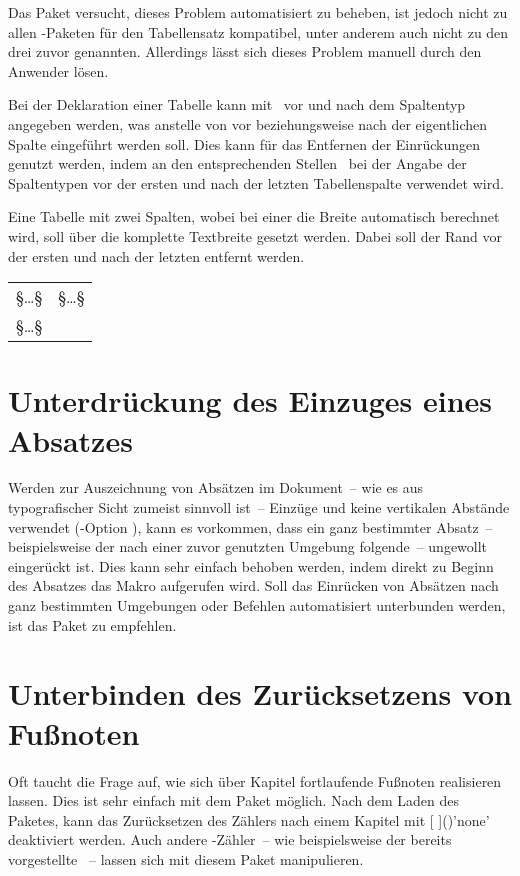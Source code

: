 Das Paket  versucht, dieses Problem automatisiert zu 
beheben, ist jedoch nicht zu allen -Paketen für den Tabellensatz 
kompatibel, unter anderem auch nicht zu den drei zuvor genannten. Allerdings 
lässt sich dieses Problem manuell durch den Anwender lösen. 

Bei der Deklaration einer Tabelle kann mit~\PParameter{\dots} vor und 
nach dem Spaltentyp angegeben werden, was anstelle von  vor 
beziehungsweise nach der eigentlichen Spalte eingeführt werden soll. Dies kann 
für das Entfernen der Einrückungen genutzt werden, indem an den entsprechenden 
Stellen~ bei der Angabe der Spaltentypen vor der ersten 
und nach der letzten Tabellenspalte verwendet wird.
%
\begin{Example}
Eine Tabelle mit zwei Spalten, wobei bei einer die Breite automatisch berechnet 
wird, soll über die komplette Textbreite gesetzt werden. Dabei soll der Rand 
vor der ersten und nach der letzten entfernt werden.
\begin{Code}[escapechar=§]
\begin{tabularx}{\textwidth}{@{}lX@{}}
§\dots§ & §\dots§ \tabularnewline
§\dots§
\end{tabularx}
\end{Code}
\end{Example}




\section{Unterdrückung des Einzuges eines Absatzes}
%
%
Werden zur Auszeichnung von Absätzen im Dokument~-- wie es aus typografischer 
Sicht zumeist sinnvoll ist~-- Einzüge und keine vertikalen Abstände verwendet
(\KOMAScript-Option ), kann es vorkommen, dass ein ganz 
bestimmter Absatz~-- beispielsweise der nach einer zuvor genutzten Umgebung 
folgende~-- ungewollt eingerückt ist. Dies kann sehr einfach behoben werden, 
indem direkt zu Beginn des Absatzes das Makro  aufgerufen wird. 
Soll das Einrücken von Absätzen nach ganz bestimmten Umgebungen oder Befehlen 
automatisiert unterbunden werden, ist das Paket  zu 
empfehlen.



\section{Unterbinden des Zurücksetzens von Fußnoten}%
%
%
%
Oft taucht die Frage auf, wie sich über Kapitel fortlaufende Fußnoten 
realisieren lassen. Dies ist sehr einfach mit dem Paket  
möglich. Nach dem Laden des Paketes, kann das Zurücksetzen des Zählers nach 
einem Kapitel mit [%
]()'none' deaktiviert werden. Auch andere 
-Zähler~-- wie beispielsweise der bereits vorgestellte 
~-- lassen sich mit diesem Paket manipulieren.



